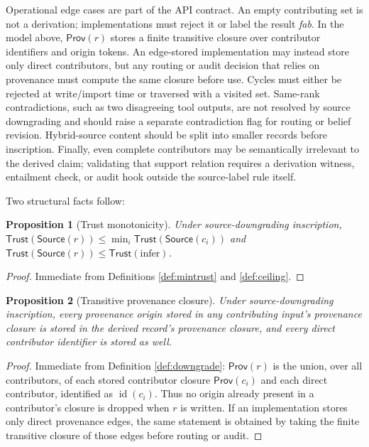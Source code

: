 \documentclass[11pt]{article}
\newtheorem{proposition}{Proposition}
\newcommand{\Source}{\mathsf{Source}}
\newcommand{\Trust}{\mathsf{Trust}}
\newcommand{\Prov}{\mathsf{Prov}}
\newcommand{\infer}{\ensuremath{\mathrm{infer}}}
\begin{document}
Operational edge cases are part of the API contract. An empty contributing set is not a derivation; implementations must reject it or label the result \emph{fab}. In the model above, $\Prov(r)$ stores a finite transitive closure over contributor identifiers and origin tokens. An edge-stored implementation may instead store only direct contributors, but any routing or audit decision that relies on provenance must compute the same closure before use. Cycles must either be rejected at write/import time or traversed with a visited set. Same-rank contradictions, such as two disagreeing tool outputs, are not resolved by source downgrading and should raise a separate contradiction flag for routing or belief revision. Hybrid-source content should be split into smaller records before inscription. Finally, even complete contributors may be semantically irrelevant to the derived claim; validating that support relation requires a derivation witness, entailment check, or audit hook outside the source-label rule itself.

Two structural facts follow:

\begin{proposition}[Trust monotonicity]
\label{prop:monotone}
Under source-downgrading inscription, $\Trust(\Source(r)) \leq \min_i \Trust(\Source(c_i))$ and $\Trust(\Source(r)) \leq \Trust(\infer)$.
\end{proposition}

\begin{proof}
Immediate from Definitions \ref{def:mintrust} and \ref{def:ceiling}.
\end{proof}

\begin{proposition}[Transitive provenance closure]
\label{prop:transitive}
Under source-downgrading inscription, every provenance origin stored in any contributing input's provenance closure is stored in the derived record's provenance closure, and every direct contributor identifier is stored as well.
\end{proposition}

\begin{proof}
Immediate from Definition \ref{def:downgrade}: $\Prov(r)$ is the union, over all contributors, of each stored contributor closure $\Prov(c_i)$ and each direct contributor, identified as $\operatorname{id}(c_i)$. Thus no origin already present in a contributor's closure is dropped when $r$ is written. If an implementation stores only direct provenance edges, the same statement is obtained by taking the finite transitive closure of those edges before routing or audit.
\end{proof}
\end{document}
